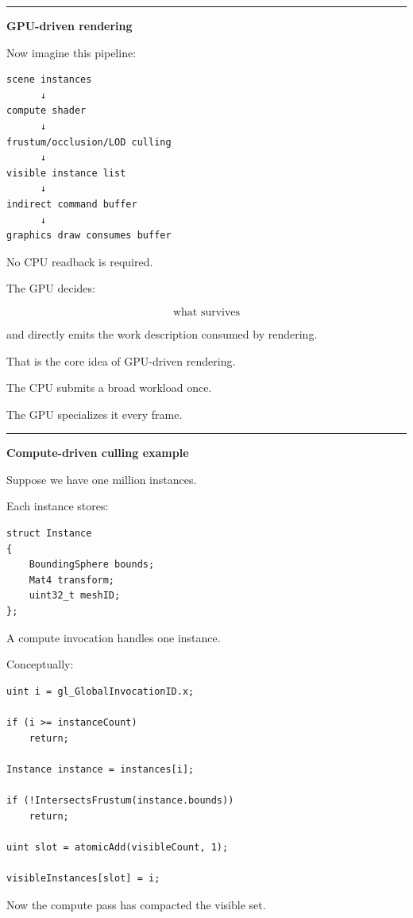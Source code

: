 \begin{center}\rule{0.5\linewidth}{0.5pt}\end{center}

\textbf{GPU-driven rendering}

Now imagine this pipeline:

\begin{verbatim}
scene instances
      ↓
compute shader
      ↓
frustum/occlusion/LOD culling
      ↓
visible instance list
      ↓
indirect command buffer
      ↓
graphics draw consumes buffer
\end{verbatim}

No CPU readback is required.

The GPU decides:

\[
\text{what survives}
\]

and directly emits the work description consumed by rendering.

That is the core idea of GPU-driven rendering.

The CPU submits a broad workload once.

The GPU specializes it every frame.

\begin{center}\rule{0.5\linewidth}{0.5pt}\end{center}

\textbf{Compute-driven culling example}

Suppose we have one million instances.

Each instance stores:

\begin{verbatim}
struct Instance
{
    BoundingSphere bounds;
    Mat4 transform;
    uint32_t meshID;
};
\end{verbatim}

A compute invocation handles one instance.

Conceptually:

\begin{verbatim}
uint i = gl_GlobalInvocationID.x;

if (i >= instanceCount)
    return;

Instance instance = instances[i];

if (!IntersectsFrustum(instance.bounds))
    return;

uint slot = atomicAdd(visibleCount, 1);

visibleInstances[slot] = i;
\end{verbatim}

Now the compute pass has compacted the visible set.

